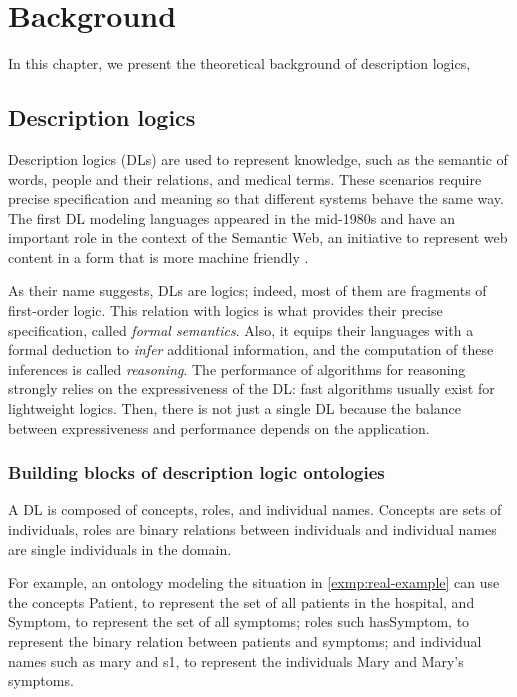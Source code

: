
\chapter{Background}
\label{cap:background}

In this chapter, we present the theoretical background of description logics, 


\section{Description logics}
Description logics (DLs) are used to represent knowledge, such as the semantic of words,  people and their relations, and medical terms. These scenarios require precise specification and meaning so that different systems behave the same way. The first DL modeling languages appeared in the mid-1980s and have an important role in the context of the Semantic Web, an initiative to represent web content in a form that is more machine friendly \citep{krotzsch2012description}.

As their name suggests, DLs are logics; indeed, most of them are fragments of first-order logic. This relation with logics is what provides their precise specification, called \emph{formal semantics}. Also, it equips their languages with a formal deduction to \emph{infer} additional information, and the computation of these inferences is called \emph{reasoning}. The performance of algorithms for reasoning strongly relies on the expressiveness of the DL: fast algorithms usually exist for lightweight logics. Then, there is not just a single DL because the balance between expressiveness and performance depends on the application. \citep{krotzsch2012description}

\subsection{Building blocks of description logic ontologies}
A DL is composed of concepts, roles, and individual names. Concepts are sets of individuals, roles are binary relations between individuals and individual names are single individuals in the domain.

For example, an ontology modeling the situation in \autoref{exmp:real-example} can use the concepts \textsf{Patient}, to represent the set of all patients in the hospital, and \textsf{Symptom}, to represent the set of all symptoms; roles such \textsf{hasSymptom}, to represent the binary relation between patients and symptoms; and individual names such as \textsf{mary} and \textsf{s1}, to represent the individuals Mary and Mary's symptoms.

